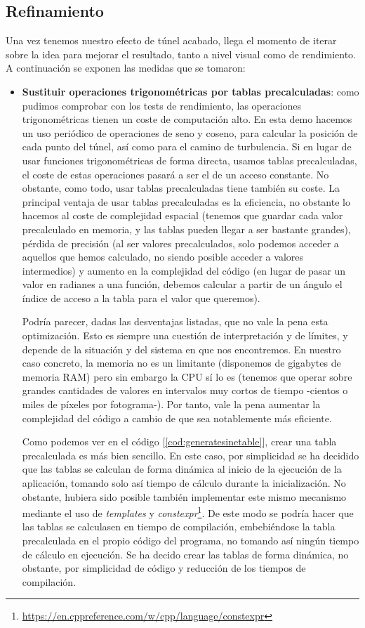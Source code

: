 \subsection{Refinamiento}

Una vez tenemos nuestro efecto de túnel acabado, llega el momento de iterar sobre la idea para mejorar el resultado, tanto a nivel visual como de rendimiento. A continuación se exponen las medidas que se tomaron:

\begin{itemize}
	\item \textbf{Sustituir operaciones trigonométricas por tablas precalculadas}: como pudimos comprobar con los tests de rendimiento, las operaciones trigonométricas tienen un coste de computación alto. En esta demo hacemos un uso periódico de operaciones de seno y coseno, para calcular la posición de cada punto del túnel, así como para el camino de turbulencia. Si en lugar de usar funciones trigonométricas de forma directa, usamos tablas precalculadas, el coste de estas operaciones pasará a ser el de un acceso constante. No obstante, como todo, usar tablas precalculadas tiene también su coste. La principal ventaja de usar tablas precalculadas es la eficiencia, no obstante lo hacemos al coste de complejidad espacial (tenemos que guardar cada valor precalculado en memoria, y las tablas pueden llegar a ser bastante grandes), pérdida de precisión (al ser valores precalculados, solo podemos acceder a aquellos que hemos calculado, no siendo posible acceder a valores intermedios) y aumento en la complejidad del código (en lugar de pasar un valor en radianes a una función, debemos calcular a partir de un ángulo el índice de acceso a la tabla para el valor que queremos).
	
	Podría parecer, dadas las desventajas listadas, que no vale la pena esta optimización. Esto es siempre una cuestión de interpretación y de límites, y depende de la situación y del sistema en que nos encontremos. En nuestro caso concreto, la memoria no es un limitante (disponemos de gigabytes de memoria RAM) pero sin embargo la CPU sí lo es (tenemos que operar sobre grandes cantidades de valores en intervalos muy cortos de tiempo -cientos o miles de píxeles por fotograma-). Por tanto, vale la pena aumentar la complejidad del código a cambio de que sea notablemente más eficiente.
	
	Como podemos ver en el código [\ref{cod:generatesinetable}], crear una tabla precalculada es más bien sencillo. En este caso, por simplicidad se ha decidido que las tablas se calculan de forma dinámica al inicio de la ejecución de la aplicación, tomando solo así tiempo de cálculo durante la inicialización. No obstante, hubiera sido posible también implementar este mismo mecanismo mediante el uso de \emph{templates} y \emph{constexpr}\footnote{\url{https://en.cppreference.com/w/cpp/language/constexpr}}. De este modo se podría hacer que las tablas se calculasen en tiempo de compilación, embebiéndose la tabla precalculada en el propio código del programa, no tomando así ningún tiempo de cálculo en ejecución. Se ha decido crear las tablas de forma dinámica, no obstante, por simplicidad de código y reducción de los tiempos de compilación.
	

\end{itemize}
